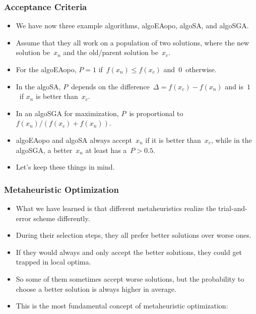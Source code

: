 \documentclass[aspectratio=169,mathserif,notheorems]{beamer}%
\begin{document}
%
\begin{frame}%
\frametitle{Acceptance Criteria}%
\begin{itemize}%
\item We have now three example algorithms, \gls{algoEAopo}, \gls{algoSA}, and \gls{algoSGA}.%
%
\item<2-> Assume that they all work on a population of two solutions, where the new solution be~$x_n$ and the old/parent solution be~$x_c$.%
%
\item<3-> For the \gls{algoEAopo}, $P=1$ if~$f(x_n)\leq f(x_c)$ and~$0$~otherwise.%
%
\item<4-> In the \gls{algoSA}, $P$~depends on the difference~$\Delta=f(x_c)-f(x_n)$ and is~$1$~if $x_n$ is better than~$x_c$.%
%
\item<5-> In an \gls{algoSGA} for maximization, $P$~is proportional to~$f(x_n)/(f(x_c)+f(x_n))$.%
%
\item<7-> \gls{algoEAopo} and \gls{algoSA} always accept~$x_n$ if it is better than~$x_c$, while in the \gls{algoSGA}, a better~$x_n$ at least has a~$P>0.5$.%
%
\item<8-> Let's keep these things in mind.%
\end{itemize}%
\end{frame}%
%
\begin{frame}%
\frametitle{Metaheuristic Optimization}%
\begin{itemize}%
\item What we have learned is that different metaheuristics realize the trial-and-error scheme differently.%
\item<2-> During their selection steps, they all prefer better solutions over worse ones.%
\item<3-> If they would always and only accept the better solutions, they could get trapped in local optima.%
\item<4-> So some of them sometimes accept worse solutions, but the probability to choose a better solution is always higher in average.%
\item<5-> This is the most fundamental concept of metaheuristic optimization:%
\end{itemize}%
%
%
%
\end{frame}%
%
%
\end{document}
